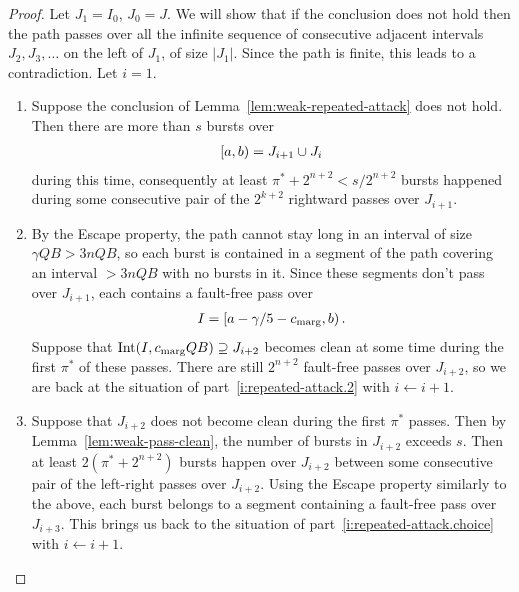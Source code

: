 \documentclass[11pt]{memoir}
\theoremstyle{definition} %
\def\B{B}
\newcommand{\Int}{\mathrm{Int}} %
\newcommand{\passno}{\pi}
\newcommand{\Q}{Q} %
\newcommand{\s}{s} %
\newcommand{\cns}[1]{c_{\textrm{\upshape #1}}}
\newcommand{\CMarg}{\cns{marg}}
\begin{document}
\begin{proof}
  Let \( J_{1}= I_{0} \), \( J_{0}=J \).
    We will show that if the conclusion does not hold then the path passes over all the
  infinite sequence of consecutive adjacent intervals  \( J_{2},J_{3},\dots \) 
  on the left of \( J_{1} \), of size \( |J_{1}| \).
  Since the path is finite, this leads to a contradiction.
  Let \( i=1 \).
 \begin{enumerate}
 \item\label{i:repeated-attack.2}
   Suppose the conclusion of  Lemma~\ref{lem:weak-repeated-attack} does not hold.
   Then there are more than \( \s  \) bursts over 
\begin{align*}
 \left[a,b\right)=J_{i+1}\cup J_{i}  
\end{align*}
during this time,
   consequently at least \( \passno^{*}+2^{n+2}<\s/2^{n+2} \) bursts happened during
   some consecutive pair of the  \( 2^{k+2} \) rightward passes over \( J_{i+1} \).

\item\label{i:repeated-attack.choice}
  By the Escape property, the path cannot stay long in an interval of size
  \( \gamma\Q\B > 3n\Q\B \),
  so each burst is contained in a segment of the path covering an interval \( >3n\Q\B \)
  with no bursts in it.
  Since these segments don't pass over \( J_{i+1} \),  each contains a fault-free pass over
  \begin{align*}
    I = \lint{a - \gamma/5-\CMarg}{b}.
  \end{align*}  
  Suppose that \( \Int(I,\CMarg\Q\B)\supseteq J_{i+2} \) becomes clean
  at some time during the first \( \passno^{*} \) of these passes.
  There are still \( 2^{n+2} \) fault-free passes over \( J_{i+2} \), so we are
  back at the situation of part~\ref{i:repeated-attack.2} with \( i\gets i+1 \).

\item\label{i:repeated-attack.1}
  Suppose that \( J_{i+2} \) does not become clean during the first \( \passno^{*} \) passes.
  Then by Lemma~\ref{lem:weak-pass-clean}, the number of bursts 
  in \( J_{i+2} \) exceeds  \( \s \).
  Then at least \( 2(\passno^{*}+2^{n+2}) \) bursts happen over \( J_{i+2} \)
  between some consecutive pair of the left-right passes over \( J_{i+2} \).
  Using the Escape property similarly to the above,
  each burst belongs to a segment containing a fault-free pass over \( J_{i+3} \).
  This brings us back to the situation of part~\ref{i:repeated-attack.choice} with \( i\gets i+1 \).
\end{enumerate}
\end{proof}
\end{document}
